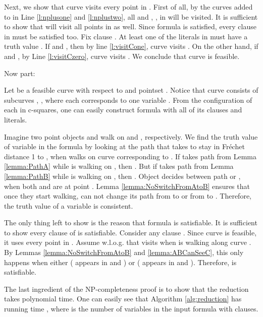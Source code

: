 \documentclass[12pt]{dalthesis}
\def\favoritefont{\bfseries \sffamily}
\def\QED{\ensuremath{{\Box}}}
\def\markatright#1{\leavevmode\unskip\nobreak\quad\hspace*{\fill}{#1}}
\newenvironment{proof}
	{\begin{trivlist}\item[\hskip\labelsep{\favoritefont Proof:}]}
	{\markatright{\QED}\end{trivlist}}
\newcommand{\Frechet}{Fr\'echet }
\begin{document}
\begin{proof}
Next, we show that curve  visits every point in . First of 
all, by the curves added to  
in Line \ref{l:nplusone} and \ref{l:nplustwo}, 
all  and , , in  will be visited. 
It is sufficient to show that  will visit all  points in   as well.
Since  formula  is satisfied, every clause  in  must be satisfied 
too. Fix clause . At least one of the literals in 
must have a truth value . If  and , 
then by line \ref{l:visitCone}, curve  visits .
On the other hand, if  and , 
by Line \ref{l:visitCzero}, curve  visits . We conclude that 
curve  is feasible.
 

Now  part:

Let  be a feasible curve with respect to  and pointset .
Notice that curve  consists of  subcurves , 
, where each corresponds to one variable . 
From the configuration of each  in c-squares, 
one can easily construct formula  with 
all of its clauses and literals. 



 
Imagine two point objects  
and  walk on  and , respectively. 
We find the truth value of variable  in the formula
by looking at the path that  takes to stay in \Frechet distance 1 to , 
when  walks on curve  corresponding to .
If  takes path  from Lemma \ref{lemma:PathA} 
while  is walking on  , then . But if  takes path  from Lemma \ref{lemma:PathB} 
while  is walking on  , then . 
Object  decides between path  or ,  when both  and  are at point . 
Lemma \ref{lemma:NoSwitchFromAtoB} ensures that  
once they start walking, 
 can not change its path from  to  
or from  to . 
Therefore, the truth value of a variable  is consistent.


The only thing left to show is the reason that formula  is satisfiable. 
It is sufficient to show every clause of  is satisfiable. 
Consider any clause .
Since curve  is feasible, 
it uses every point in .  
Assume w.l.o.g. that  visits  
when  is walking along curve .  
By Lemmas 
\ref{lemma:NoSwitchFromAtoB} and \ref{lemma:ABCanSeeC},
this only happens when either ( appears in  and )
or ( appears in  and ). 
Therefore,  is satisfiable.
















 

The last ingredient of the NP-completeness proof is
to show that the reduction takes polynomial time.  
One can easily see that Algorithm \ref{alg:reduction}
has running time , 
where  is the number of variables in 
the input formula with  clauses.






\end{proof}
\end{document}
